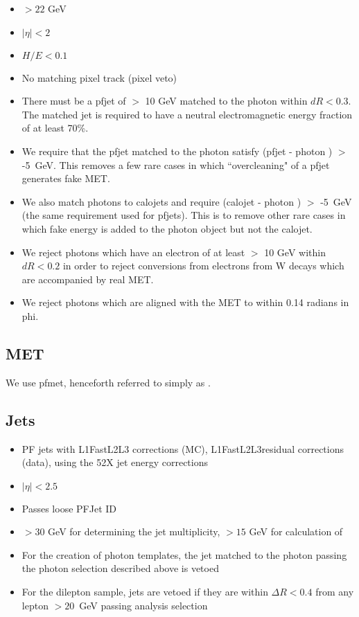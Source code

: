 \begin{itemize}
\item \pt $ > 22$ GeV
\item $|\eta| < 2$
\item $H/E < 0.1$
\item No matching pixel track (pixel veto)
\item There must be a pfjet of \pt $ >$ 10 GeV matched to the photon within $dR < 0.3$. 
The matched jet is required to have a neutral electromagnetic energy fraction of at least 70\%.
\item 
  We require that the pfjet \pt matched to the photon satisfy
  (pfjet \pt - photon \pt) $>$ -5~GeV.
  This removes a few rare cases in which ``overcleaning" of a
  pfjet
  generates fake MET.

\item We also match photons to calojets and require (calojet \pt - photon \pt) $>$ -5~GeV
  (the same requirement used for pfjets). This is to remove other rare cases in which fake
  energy is added to the photon object but not the calojet.

\item We reject photons which have an electron of at least \pt $>$ 10 GeV 
  within $dR < 0.2$
  in order to reject
  conversions from electrons from W decays which are accompanied by real MET.

\item We reject photons which are aligned with the MET to within 0.14 radians in phi.

\end{itemize}

\subsection{MET}

We use pfmet, henceforth referred to simply as \MET.

\subsection{Jets}
\label{sec:jetsel}

\begin{itemize}
\item PF jets with L1FastL2L3 corrections (MC), L1FastL2L3residual corrections (data), using the 52X jet energy corrections
\item $|\eta| < 2.5$
\item Passes loose PFJet ID
\item \pt $ > 30$ GeV for determining the jet multiplicity, \pt $ > 15$ GeV for calculation of \Ht
\item For the creation of photon templates, the jet matched to the photon passing the photon selection described above is vetoed
\item For the dilepton sample, jets are vetoed if they are within $\Delta R < 0.4$ from any lepton \pt $ > 20$~GeV passing analysis selection
\end{itemize}

